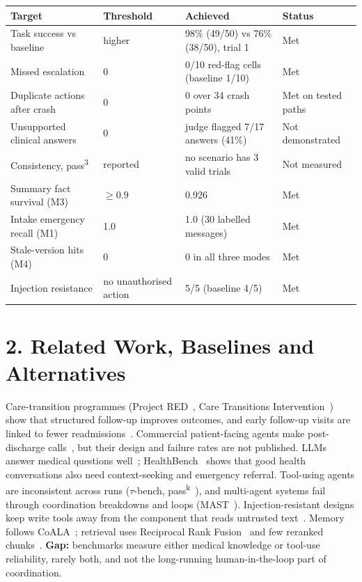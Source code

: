 \documentclass[10pt,a4paper]{article}
\begin{document}
\begin{table}[htbp]
\centering
\footnotesize
\begin{tabularx}{\textwidth}{P{4.4cm} P{2.4cm} L P{2.4cm}}
\toprule
\textbf{Target} & \textbf{Threshold} & \textbf{Achieved} & \textbf{Status} \\
\midrule
Task success vs baseline & higher & 98\% (49/50) vs 76\% (38/50), trial 1 & Met \\
Missed escalation & 0 & 0/10 red-flag cells (baseline 1/10) & Met \\
Duplicate actions after crash & 0 & 0 over 34 crash points & Met on tested paths \\
Unsupported clinical answers & 0 & judge flagged 7/17 answers (41\%) & Not demonstrated \\
Consistency, pass\textsuperscript{3} & reported & no scenario has 3 valid trials & Not measured \\
Summary fact survival (M3) & $\geq 0.9$ & 0.926 & Met \\
Intake emergency recall (M1) & 1.0 & 1.0 (30 labelled messages) & Met \\
Stale-version hits (M4) & 0 & 0 in all three modes & Met \\
Injection resistance & no unauthorised action & 5/5 (baseline 4/5) & Met \\
\bottomrule
\end{tabularx}
\end{table}

\FloatBarrier
\section*{2. Related Work, Baselines and Alternatives}

Care-transition programmes (Project RED~\cite{red}, Care Transitions Intervention~\cite{coleman}) show that structured follow-up improves outcomes, and early follow-up visits are linked to fewer readmissions~\cite{hernandez}. Commercial patient-facing agents make post-discharge calls~\cite{commercial}, but their design and failure rates are not published. LLMs answer medical questions well~\cite{medpalm}; HealthBench~\cite{healthbench} shows that good health conversations also need context-seeking and emergency referral. Tool-using agents are inconsistent across runs ($\tau$-bench, pass\textsuperscript{k}~\cite{taubench}), and multi-agent systems fail through coordination breakdowns and loops (MAST~\cite{mast}). Injection-resistant designs keep write tools away from the component that reads untrusted text~\cite{injection}. Memory follows CoALA~\cite{coala}; retrieval uses Reciprocal Rank Fusion~\cite{rrf} and few reranked chunks~\cite{lostmiddle}. \textbf{Gap:} benchmarks measure either medical knowledge or tool-use reliability, rarely both, and not the long-running human-in-the-loop part of coordination.
\end{document}
